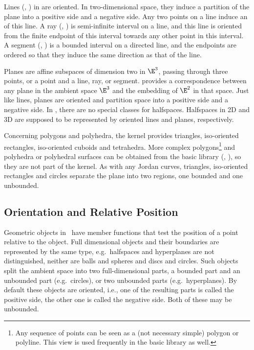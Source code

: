 Lines  (, ) in {\cgal} are oriented. In 
two-dimensional space, they induce a partition of the plane
into a positive side and a negative side. 
Any two points on a line induce an 
of this line. 
A ray (, ) is semi-infinite interval on a line, 
and this line is oriented from the finite endpoint of this interval towards 
any other point in this interval. A segment (, 
) is a bounded interval on a directed line,
and the endpoints are ordered so that they induce the same direction 
as that of the line.  

Planes are affine subspaces of dimension two in $\E^3$, passing through 
three points, or a point and a line, ray, or segment. 
{\cgal} provides a correspondence between any plane in the ambient 
space $\E^3$ and the embedding of $\E^2$ in that space.
Just like lines, planes are oriented and partition space into a positive side 
and a negative side.
In \cgal, there are no special classes for halfspaces. Halfspaces in 2D and
3D are supposed to be represented by oriented lines and planes, respectively.

Concerning polygons and polyhedra, the kernel provides triangles,
iso-oriented rectangles, iso-oriented cuboids and tetrahedra. 
More complex polygons\footnote{Any sequence of points can be seen as
a (not necessary simple) polygon or polyline. This view is used 
frequently in the basic library as well.}
and polyhedra or polyhedral surfaces can be obtained 
from the basic library (, ), 
so they are not part of the kernel. 
As with any Jordan curves, triangles, iso-oriented rectangles and circles
separate the plane into two regions, one bounded and one unbounded.  

\subsection{Orientation and Relative Position}
Geometric objects in \cgal\ have member functions that test the
position of a point relative to the object.  Full dimensional objects
and their boundaries are represented by the same type, 
e.g.\ halfspaces and hyperplanes are not distinguished, neither are balls and
spheres and discs and circles. Such objects split the ambient space into two
full-dimensional parts, a bounded part and an unbounded part 
(e.g.\ circles), or two unbounded parts (e.g.\ hyperplanes). By default these
objects are oriented, i.e., one of the resulting parts is called the
positive side, the other one is called the negative side. Both of
these may be unbounded.

